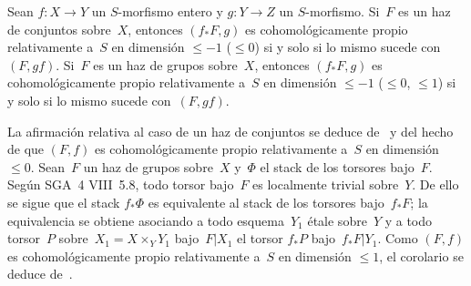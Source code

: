 
\begin{corollaire}
\label{XIII.1.9}
Sean $f\colon X\to Y$ un $S$-morfismo entero y $g\colon Y\to Z$ un
$S$-morfismo. Si~$F$ es un haz de conjuntos sobre~$X$, entonces
$(f_*F,g)$ es cohomológicamente propio relativamente a~$S$ en dimensión
$\leqslant -1$ (\resp $\leqslant 0$) si y solo si lo mismo sucede con
$(F,gf)$. Si~$F$ es un haz de grupos sobre~$X$, entonces $(f_*F,g)$ es
cohomológicamente propio relativamente a~$S$ en dimensión
$\leqslant -1$ (\resp $\leqslant 0$, \resp $\leqslant 1$) si y solo si
lo mismo sucede con~$(F,gf)$.
\end{corollaire}

La afirmación
relativa al caso de un haz de conjuntos se deduce de~ y
del hecho de que $(F,f)$ es cohomológicamente propio relativamente a~$S$
en dimensión $\leqslant 0$. Sean~$F$ un haz de grupos sobre~$X$ y~$\Phi$
el stack de los torsores bajo~$F$. Según SGA~4 VIII~5.8, todo torsor
bajo~$F$ es localmente trivial sobre~$Y$. De ello se sigue que el stack
$f_*\Phi$ es equivalente al stack de los torsores bajo~$f_*F$; la
equivalencia se obtiene asociando a todo esquema~$Y_1$ étale sobre~$Y$ y
a todo torsor~$P$ sobre~$X_1=X\times_Y Y_1$ bajo~$F|X_1$ el torsor
$f_*P$ bajo~$f_*F|Y_1$. Como $(F,f)$ es cohomológicamente propio
relativamente a~$S$ en dimensión $\leqslant 1$, el corolario se deduce
de~.
